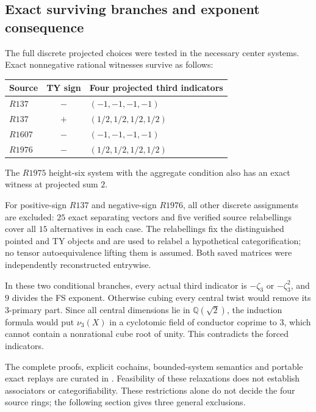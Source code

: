 \subsection{Exact surviving branches and exponent consequence}
The full discrete projected choices were tested in the necessary center
systems. Exact nonnegative rational witnesses survive as follows:
\begin{center}\begin{tabular}{lcl}
\toprule Source & TY sign & Four projected third indicators\\\midrule
$R137$ & $-$ & $(-1,-1,-1,-1)$\\
$R137$ & $+$ & $(1/2,1/2,1/2,1/2)$\\
$R1607$ & $-$ & $(-1,-1,-1,-1)$\\
$R1976$ & $-$ & $(1/2,1/2,1/2,1/2)$\\\bottomrule
\end{tabular}\end{center}
The $R1975$ height-six system with the aggregate condition also has
an exact witness at projected sum $2$.

For positive-sign $R137$ and negative-sign $R1976$, all other discrete
assignments are excluded: $25$ exact separating vectors and five
verified source relabellings cover all $15$ alternatives in each case.
The relabellings fix the distinguished pointed and TY objects and are
used to relabel a hypothetical categorification; no tensor
autoequivalence lifting them is assumed. Both saved matrices were
independently reconstructed entrywise.

In these two conditional branches, every actual third indicator is
$-\zeta_3$ or $-\zeta_3^2$, and $9$ divides the FS exponent. Otherwise
cubing every central twist would remove its $3$-primary part. Since
all central dimensions lie in $\mathbb Q(\sqrt2)$, the induction formula
would put $\nu_3(X)$ in a cyclotomic field of conductor coprime to $3$,
which cannot contain a nonrational cube root of unity. This contradicts
the forced indicators.

The complete proofs, explicit cochains, bounded-system semantics and
portable exact replays are curated in
.
Feasibility of these relaxations does not establish associators or
categorifiability. These restrictions alone do not decide the four source rings; the following section gives three general exclusions.

